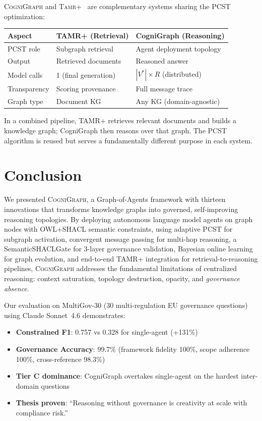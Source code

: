 \documentclass[a4paper,11pt]{article}
\theoremstyle{definition}
\newcommand{\cogni}{\textsc{CogniGraph}}
\newcommand{\tamr}{\textsc{Tamr+}}
\begin{document}
\cogni{} and \tamr{}~\cite{tamrplus2026} are complementary systems sharing the PCST optimization:

\begin{center}
\begin{tabular}{lll}
\toprule
\textbf{Aspect} & \textbf{TAMR+ (Retrieval)} & \textbf{CogniGraph (Reasoning)} \\
\midrule
PCST role & Subgraph retrieval & Agent deployment topology \\
Output & Retrieved documents & Reasoned answer \\
Model calls & 1 (final generation) & $|V^*| \times R$ (distributed) \\
Transparency & Scoring provenance & Full message trace \\
Graph type & Document KG & Any KG (domain-agnostic) \\
\bottomrule
\end{tabular}
\end{center}

In a combined pipeline, TAMR+ retrieves relevant documents and builds a knowledge graph; CogniGraph then reasons over that graph. The PCST algorithm is reused but serves a fundamentally different purpose in each system.

\section{Conclusion}
\label{sec:conclusion}

We presented \cogni{}, a Graph-of-Agents framework with thirteen innovations that transforms knowledge graphs into governed, self-improving reasoning topologies.
By deploying autonomous language model agents on graph nodes with OWL+SHACL semantic constraints, using adaptive PCST for subgraph activation, convergent message passing for multi-hop reasoning, a SemanticSHACLGate for 3-layer governance validation, Bayesian online learning for graph evolution, and end-to-end TAMR+ integration for retrieval-to-reasoning pipelines, \cogni{} addresses the fundamental limitations of centralized reasoning: context saturation, topology destruction, opacity, and \textit{governance absence}.

Our evaluation on MultiGov-30 (30 multi-regulation EU governance questions) using Claude Sonnet~4.6 demonstrates:
\begin{itemize}
\item \textbf{Constrained F1}: 0.757 vs 0.328 for single-agent (+131\%)
\item \textbf{Governance Accuracy}: 99.7\% (framework fidelity 100\%, scope adherence 100\%, cross-reference 98.3\%)
\item \textbf{Tier C dominance}: CogniGraph overtakes single-agent on the hardest inter-domain questions
\item \textbf{Thesis proven}: ``Reasoning without governance is creativity at scale with compliance risk.''
\end{itemize}
\end{document}

